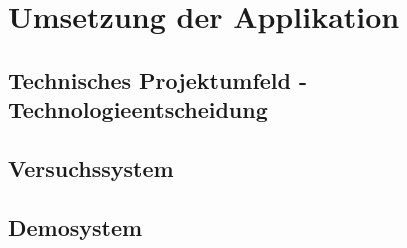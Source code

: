 \section{Umsetzung der Applikation}
\subsection{Technisches Projektumfeld - Technologieentscheidung}
\subsection{Versuchssystem}
\subsection{Demosystem}
